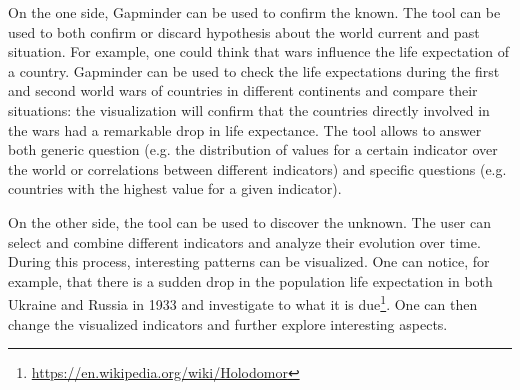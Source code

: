 On the one side, Gapminder can be used to confirm the known.
The tool can be used to both confirm or discard hypothesis about the world current and past situation.
For example, one could think that wars influence the life expectation of a country.
Gapminder can be used to check the life expectations during the first and second world wars of countries in different continents and compare their situations:
the visualization will confirm that the countries directly involved in the wars had a remarkable drop in life expectance.
The tool allows to answer both generic question (e.g. the distribution of values for a certain indicator over the world or correlations between different indicators) and specific questions (e.g. countries with the highest value for a given indicator).

On the other side, the tool can be used to discover the unknown.
The user can select and combine different indicators and analyze their evolution over time.
During this process, interesting patterns can be visualized.
One can notice, for example, that there is a sudden drop in the population life expectation in both Ukraine and Russia in 1933 and investigate to what it is due\footnote{\url{https://en.wikipedia.org/wiki/Holodomor}}.
One can then change the visualized indicators and further explore interesting aspects.

